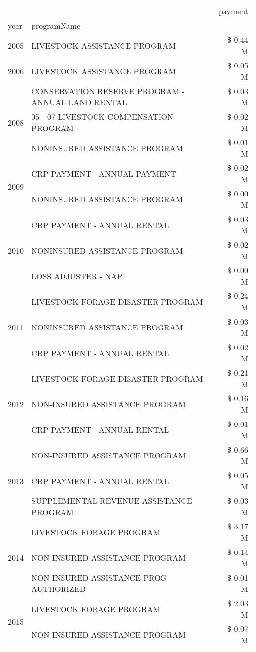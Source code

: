 \begin{tabular}{llr}
\toprule
 &  & payment \\
year & programName &  \\
\midrule
2005 & LIVESTOCK ASSISTANCE PROGRAM & \$ 0.44 M \\
\cline{1-3}
2006 & LIVESTOCK ASSISTANCE PROGRAM & \$ 0.05 M \\
\cline{1-3}
\multirow[t]{3}{*}{2008} & CONSERVATION RESERVE PROGRAM - ANNUAL LAND RENTAL & \$ 0.03 M \\
 & 05 - 07 LIVESTOCK COMPENSATION PROGRAM & \$ 0.02 M \\
 & NONINSURED ASSISTANCE PROGRAM & \$ 0.01 M \\
\cline{1-3}
\multirow[t]{2}{*}{2009} & CRP PAYMENT - ANNUAL PAYMENT & \$ 0.02 M \\
 & NONINSURED ASSISTANCE PROGRAM & \$ 0.00 M \\
\cline{1-3}
\multirow[t]{3}{*}{2010} & CRP PAYMENT - ANNUAL RENTAL & \$ 0.03 M \\
 & NONINSURED ASSISTANCE PROGRAM & \$ 0.02 M \\
 & LOSS ADJUSTER - NAP & \$ 0.00 M \\
\cline{1-3}
\multirow[t]{3}{*}{2011} & LIVESTOCK FORAGE DISASTER PROGRAM & \$ 0.24 M \\
 & NONINSURED ASSISTANCE PROGRAM & \$ 0.03 M \\
 & CRP PAYMENT - ANNUAL RENTAL & \$ 0.02 M \\
\cline{1-3}
\multirow[t]{3}{*}{2012} & LIVESTOCK FORAGE DISASTER PROGRAM & \$ 0.21 M \\
 & NON-INSURED ASSISTANCE PROGRAM & \$ 0.16 M \\
 & CRP PAYMENT - ANNUAL RENTAL & \$ 0.01 M \\
\cline{1-3}
\multirow[t]{3}{*}{2013} & NON-INSURED ASSISTANCE PROGRAM & \$ 0.66 M \\
 & CRP PAYMENT - ANNUAL RENTAL & \$ 0.05 M \\
 & SUPPLEMENTAL REVENUE ASSISTANCE PROGRAM & \$ 0.03 M \\
\cline{1-3}
\multirow[t]{3}{*}{2014} & LIVESTOCK FORAGE PROGRAM & \$ 3.17 M \\
 & NON-INSURED ASSISTANCE PROGRAM & \$ 0.14 M \\
 & NON-INSURED ASSISTANCE PROG AUTHORIZED & \$ 0.01 M \\
\cline{1-3}
\multirow[t]{3}{*}{2015} & LIVESTOCK FORAGE PROGRAM & \$ 2.03 M \\
 & NON-INSURED ASSISTANCE PROGRAM & \$ 0.07 M \\

\end{tabular}
